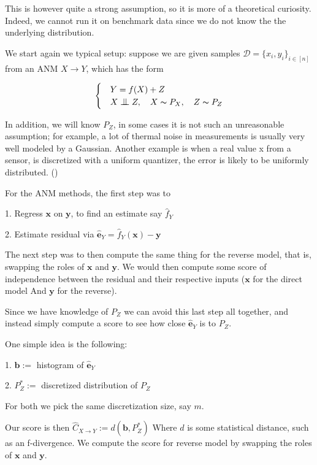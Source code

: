 This is however quite a strong assumption, so it is more of a theoretical curiosity. Indeed, we 
cannot run it on benchmark data since we do not know the the underlying distribution. 

We start again we typical setup:
suppose we are given samples $\mathcal{D} = \{x_i, y_i\}_{i \in [n]}$ from an ANM $X \rightarrow Y$, which has the form

\[
    \begin{cases} 
        & Y = f(X) + Z \\
        & X \bigCI Z,\quad X \thicksim P_X,\quad Z \thicksim P_{Z}  
     \end{cases}  
\]

In addition, we will know $P_{Z}$, in some cases it is not such an unreasonable assumption; for example, 
a lot of thermal noise in measurements is usually very well modeled by a Gaussian. Another example 
is when a real value x from a sensor, is discretized with a uniform quantizer, the error is 
likely to be uniformly distributed. (\cite{uniformCond})

For the ANM methods, the first step was to 

1. Regress $\mathbf{x}$ on $\mathbf{y}$, to find an estimate say $\hat{f}_Y$

2. Estimate residual via $\mathbf{\hat{e}}_Y = \hat{f}_Y(\mathbf{x}) - \mathbf{y}$

The next step was to then compute the same thing for the reverse model, that is, swapping the 
roles of $\mathbf{x}$ and $\mathbf{y}$. We would then compute some score of independence 
between the residual and their respective inputs ($\mathbf{x}$ for the direct model And
 $\mathbf{y}$ for the reverse). 

 Since we have knowledge of $P_Z$ we can avoid this last step all together, and instead simply 
 compute a score to see how close $\mathbf{\hat{e}}_Y$ is to $P_Z$. 

 One simple idea is the following:

 1. $\mathbf{b} :=$ histogram of $\mathbf{\hat{e}}_Y$

 2. $P^*_Z :=$  discretized distribution of $P_Z$

 For both we pick the same discretization size, say $m$. 

 Our score is then 
 $
     \hat{C}_{X \rightarrow Y} := d\left(\mathbf{b}, P^*_Z \right)
 $
 Where $d$ is some statistical distance, such as an f-divergence. We compute the score for reverse model 
 by swapping the roles of $\mathbf{x}$ and $\mathbf{y}$.


